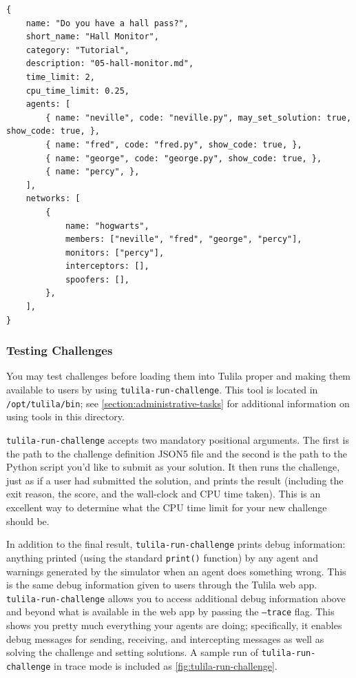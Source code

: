 \documentclass[12pt]{article}
\begin{document}
\begin{small}
\begin{verbatim}
{
    name: "Do you have a hall pass?",
    short_name: "Hall Monitor",
    category: "Tutorial",
    description: "05-hall-monitor.md",
    time_limit: 2,
    cpu_time_limit: 0.25,
    agents: [
        { name: "neville", code: "neville.py", may_set_solution: true, show_code: true, },
        { name: "fred", code: "fred.py", show_code: true, },
        { name: "george", code: "george.py", show_code: true, },
        { name: "percy", },
    ],
    networks: [
        {
            name: "hogwarts",
            members: ["neville", "fred", "george", "percy"],
            monitors: ["percy"],
            interceptors: [],
            spoofers: [],
        },
    ],
}
\end{verbatim}
\end{small}

\subsubsection{Testing Challenges}
\label{section:testing-challenges}

You may test challenges before loading them into Tulila proper and making them available to users by using \texttt{tulila-run-challenge}. This tool is located in \texttt{/opt/tulila/bin}; see \cref{section:administrative-tasks} for additional information on using tools in this directory.

\texttt{tulila-run-challenge} accepts two mandatory positional arguments. The first is the path to the challenge definition JSON5 file and the second is the path to the Python script you'd like to submit as your solution. It then runs the challenge, just as if a user had submitted the solution, and prints the result (including the exit reason, the score, and the wall-clock and CPU time taken). This is an excellent way to determine what the CPU time limit for your new challenge should be.

In addition to the final result, \texttt{tulila-run-challenge} prints debug information: anything printed (using the standard \texttt{print()} function) by any agent and warnings generated by the simulator when an agent does something wrong. This is the same debug information given to users through the Tulila web app. \texttt{tulila-run-challenge} allows you to access additional debug information above and beyond what is available in the web app by passing the \texttt{--trace} flag. This shows you pretty much everything your agents are doing; specifically, it enables debug messages for sending, receiving, and intercepting messages as well as solving the challenge and setting solutions. A sample run of \texttt{tulila-run-challenge} in trace mode is included as \cref{fig:tulila-run-challenge}.
\end{document}
